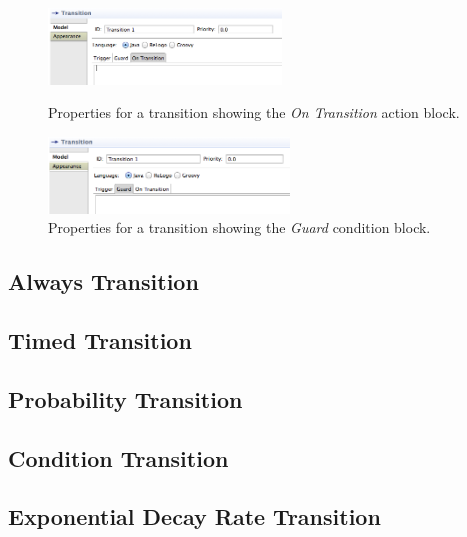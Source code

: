 \documentclass[11pt]{amsart}
\begin{document}
\begin{figure}

\begin{minipage}{.5\textwidth}
\begin{center}
\vspace{.2in}
\centerline {
\includegraphics[height=0.8in]{StatechartsImages/TransitionPropertiesOnTransition.png}
}
\caption{Properties for a transition showing the \emph{On Transition} action block.}
\label{fig:transitionPropertiesOnTransition}
\end{center}
\end{minipage}%
\begin{minipage}{.5\textwidth}
\begin{center}
\vspace{.2in}
\centerline {
\includegraphics[height=0.8in]{StatechartsImages/TransitionPropertiesGuard.png}
}
\caption{Properties for a transition showing the \emph{Guard} condition block.}
\label{fig:transitionPropertiesGuard}
\end{center}
\end{minipage}

\end{figure}


\subsection{Always Transition}
\subsection{Timed Transition}
\subsection{Probability Transition}
\subsection{Condition Transition}
\subsection{Exponential Decay Rate Transition}
\end{document}
